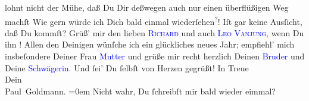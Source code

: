                lohnt nicht der Mühe, daß Du Dir deßwegen auch nur einen überflüßigen Weg machſt{\dotsfive}\pend
           \pstart
           {\pb}Wie gern würde ich Dich bald einmal wiederſehen\substVorne{}\textsuperscript{?}\substDazwischen{}!\substHinten{} Iſt gar keine Ausſicht, daß Du \label{K_L02792-54v}\label{K_L02792-54h} kommſt?\pend
           \pstart
           Grüß’ mir den lieben \textsc{\textcolor{blue}{Richard}{}\ledrightnote{\textcolor{blue}{Richard Beer-Hofmann}}} und auch \textsc{\textcolor{blue}{Leo Vanjung}{}\ledrightnote{\textcolor{blue}{Leo Van-Jung}}}, wenn Du ihn \label{K_L02792-90v}\label{K_L02792-90h}!\pend
           \pstart
           Allen den Deinigen wünſche ich ein glückliches neues Jahr; empfiehl’ mich
               insbeſondere Deiner Frau \textcolor{blue}{Mutter}{} und grüße mir recht herzlich Deinen \textcolor{blue}{Bruder}{} und Deine \textcolor{blue}{Schwägerin}{}.\pend
           \pstart
           {\pb}Und ſei’ Du ſelbſt von Herzen gegrüßt!\pend
           \pstart
           In Treue {\\[\baselineskip]}Dein {\\[\baselineskip]}\spacefill\mbox{Paul Goldmann.}\pend
           \leftskip=0em{}\pstart
           \noindent{}Nicht wahr, Du ſchreibſt mir bald wieder eimmal?\pend
           \endnumbering{}  
      